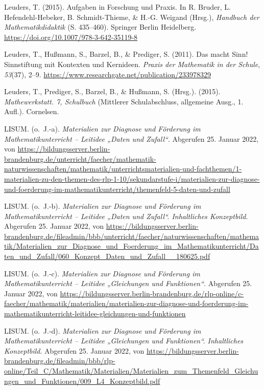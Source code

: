 \documentclass[
]{scrbook}
\newlength{\cslhangindent}
\newlength{\cslentryspacingunit} %
\newenvironment{CSLReferences}[2] %
 {%
  \setlength{\parindent}{0pt}
  \ifodd #1
  \let\oldpar\par
  \def\par{\hangindent=\cslhangindent\oldpar}
  \fi
  \setlength{\parskip}{#2\cslentryspacingunit}
 }%
 {}
\theoremstyle{definition}
\theoremstyle{definition}
\theoremstyle{definition}
\theoremstyle{definition}
\theoremstyle{remark}
\begin{document}
\begin{CSLReferences}{1}{0}
\leavevmode{}%
Leuders, T. (2015). Aufgaben in {Forschung} und {Praxis}. In R. Bruder, L. Hefendehl-Hebeker, B. Schmidt-Thieme, \& H.-G. Weigand (Hrsg.), \emph{Handbuch der {Mathematikdidaktik}} (S. 435--460). Springer Berlin Heidelberg. \url{https://doi.org/10.1007/978-3-642-35119-8}

\leavevmode{}%
Leuders, T., Hußmann, S., Barzel, B., \& Prediger, S. (2011). Das macht {Sinn}! {Sinnstiftung} mit {Kontexten} und {Kernideen}. \emph{Praxis der Mathematik in der Schule}, \emph{53}(37), 2--9. \url{https://www.researchgate.net/publication/233978329}

\leavevmode{}%
Leuders, T., Prediger, S., Barzel, B., \& Hußmann, S. (Hrsg.). (2015). \emph{Mathewerkstatt. 7, {Schulbuch}} (Mittlerer Schulabschluss, allgemeine Ausg., 1. Aufl.). Cornelsen.

\leavevmode{}%
LISUM. (o.~J.-a). \emph{Materialien zur {Diagnose} und {Förderung} im {Mathematikunterricht} -- {Leitidee} „{Daten} und {Zufall}``}. Abgerufen 25. Januar 2022, von \url{https://bildungsserver.berlin-brandenburg.de/unterricht/faecher/mathematik-naturwissenschaften/mathematik/unterrichtsmaterialien-und-fachthemen/1-materialien-zu-den-themen-des-rlp-1-10/sekundarstufe-i/materialien-zur-diagnose-und-foerderung-im-mathematikunterricht/themenfeld-5-daten-und-zufall}

\leavevmode{}%
LISUM. (o.~J.-b). \emph{Materialien zur {Diagnose} und {Förderung} im {Mathematikunterricht} -- {Leitidee} „{Daten} und {Zufall}``. {Inhaltliches} {Konzeptbild}}. Abgerufen 25. Januar 2022, von \url{https://bildungsserver.berlin-brandenburg.de/fileadmin/bbb/unterricht/faecher/naturwissenschaften/mathematik/Materialien_zur_Diagnose_und_Foerderung_im_Mathematikunterricht/Daten_und_Zufall/060_Konzept_Daten_und_Zufall__180625.pdf}

\leavevmode{}%
LISUM. (o.~J.-c). \emph{Materialien zur {Diagnose} und {Förderung} im {Mathematikunterricht} -- {Leitidee} „{Gleichungen} und {Funktionen}``}. Abgerufen 25. Januar 2022, von \url{https://bildungsserver.berlin-brandenburg.de/rlp-online/c-faecher/mathematik/materialien/materialien-zur-diagnose-und-foerderung-im-mathematikunterricht-leitidee-gleichungen-und-funktionen}

\leavevmode{}%
LISUM. (o.~J.-d). \emph{Materialien zur {Diagnose} und {Förderung} im {Mathematikunterricht} -- {Leitidee} „{Gleichungen} und {Funktionen}``. {Inhaltliches} {Konzeptbild}}. Abgerufen 25. Januar 2022, von \url{https://bildungsserver.berlin-brandenburg.de/fileadmin/bbb/rlp-online/Teil_C/Mathematik/Materialien/Materialien_zum_Themenfeld_Gleichungen_und_Funktionen/009_L4_Konzeptbild.pdf}


\end{CSLReferences}
\end{document}
